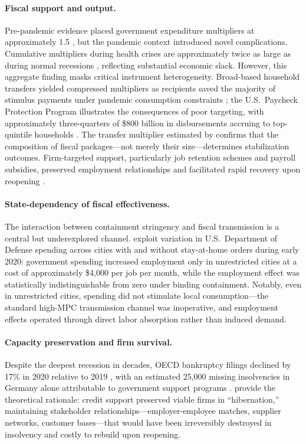 \paragraph{Fiscal support and output.} Pre-pandemic evidence placed
government expenditure multipliers at approximately 1.5
\citep{ramey2018}, but the pandemic context introduced
novel complications. Cumulative multipliers during health crises are
approximately twice as large as during normal recessions \citep{deb2021},
reflecting substantial economic slack. However, this aggregate finding masks
critical instrument heterogeneity. Broad-based household transfers yielded
compressed multipliers as recipients saved the majority of stimulus payments
under pandemic consumption constraints \citep{chetty2020, coibion2020}; the
U.S.\ Paycheck Protection Program illustrates the consequences of poor
targeting, with approximately three-quarters of \$800 billion in
disbursements accruing to top-quintile households \citep{autor2022}. The
transfer multiplier estimated by \citet{bayer2023} confirms that the
composition of fiscal packages---not merely their size---determines
stabilization outcomes. Firm-targeted support, particularly job retention
schemes and payroll subsidies, preserved employment relationships and
facilitated rapid recovery upon reopening \citep{bennedsen2020}.

\paragraph{State-dependency of fiscal effectiveness.} The interaction between
containment stringency and fiscal transmission is a central but
underexplored channel. \citet{auerbach2022} exploit variation in U.S.\
Department of Defense spending across cities with and without stay-at-home
orders during early 2020: government spending increased employment only in
unrestricted cities at a cost of approximately \$4,000 per job per month,
while the employment effect was statistically indistinguishable from zero
under binding containment. Notably, even in unrestricted cities, spending did
not stimulate local consumption---the standard high-MPC transmission channel
was inoperative, and employment effects operated through direct labor
absorption rather than induced demand.

\paragraph{Capacity preservation and firm survival.} Despite the deepest
recession in decades, OECD bankruptcy filings declined by 17\% in 2020
relative to 2019 \citep{djankov2021}, with an estimated 25,000 missing
insolvencies in Germany alone attributable to government support programs
\citep{banerjee2021}. \citet{gourinchas2021} provide the theoretical
rationale: credit support preserved viable firms in ``hibernation,''
maintaining stakeholder relationships---employer-employee matches, supplier
networks, customer bases---that would have been irreversibly destroyed in
insolvency and costly to rebuild upon reopening.

